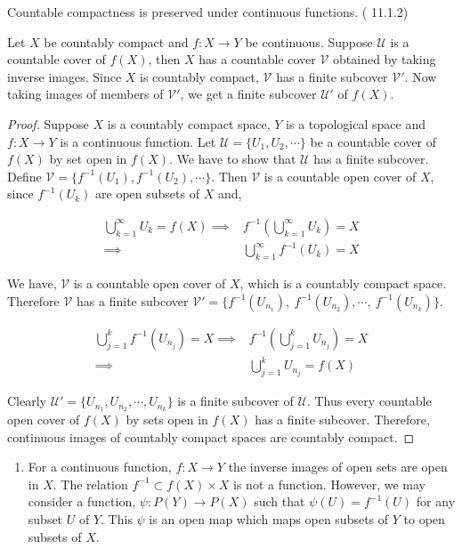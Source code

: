 \begin{theorem}
	Countable compactness is preserved under continuous functions. (\cite{joshi} 11.1.2)
\end{theorem}
\begin{synopsis}
	Let $X$ be countably compact and $f:X\to Y$ be continuous. Suppose $\mathcal{U}$ is a countable cover of $f(X)$, then $X$ has a countable cover $\mathcal{V}$ obtained by taking inverse images. Since $X$ is countably compact, $\mathcal{V}$ has a finite subcover $\mathcal{V}'$. Now taking images of members of $\mathcal{V}'$, we get a finite subcover $\mathcal{U}'$ of $f(X)$.
\end{synopsis}
\begin{proof}
	Suppose $X$ is a countably compact space, $Y$ is a topological space and $f:X \to Y$ is a continuous function. Let $\mathcal{U} = \{ U_1, U_2,\cdots \}$ be a countable cover of $f(X)$ by set open in $f(X)$. We have to show that $\mathcal{U}$ has a finite subcover.\\

	Define $\mathcal{V} = \{ f^{-1}(U_1), f^{-1}(U_2), \cdots \}$. Then $\mathcal{V}$ is a countable open cover of $X$, since $f^{-1}(U_k)$ are open subsets of $X$ and,

\begin{align*}
	\bigcup_{k = 1}^\infty U_k = f(X) \implies & f^{-1}\left(\bigcup_{k=1}^\infty U_k\right) = X\\
	\implies & \bigcup_{k = 1}^\infty f^{-1}(U_k) = X
\end{align*}

	We have, $\mathcal{V}$ is a countable open cover of $X$, which is a countably compact space. Therefore $\mathcal{V}$ has a finite subcover $\mathcal{V}' = \{ f^{-1}(U_{n_1}),\ f^{-1}(U_{n_2}),\cdots,\ f^{-1}(U_{n_k}) \}$.

\begin{align*}
	\bigcup_{j=1}^k f^{-1}(U_{n_j}) = X \implies & f^{-1}\left(\bigcup_{j=1}^k U_{n_j}\right) = X\\
	\implies & \bigcup_{j=1}^k U_{n_j} = f(X)
\end{align*}

	Clearly $\mathcal{U}' = \{ U_{n_1},U_{n_2},\cdots,U_{n_k}\}$ is a finite subcover of $\mathcal{U}$. Thus every countable open cover of $f(X)$ by sets open in $f(X)$ has a finite subcover. Therefore, continuous images of countably compact spaces are countably compact.
\end{proof}

\begin{remark}
	\begin{enumerate}
		\item For a continuous function, $f : X \to Y$ the inverse images of open sets are open in $X$. The relation $f^{-1} \subset f(X) \times X$ is not a function. However, we may consider a function, $\psi : P(Y) \to P(X)$ such that $\psi(U) = f^{-1}(U)$ for any subset $U$ of $Y$. This $\psi$ is an open map which maps open subsets of $Y$ to open subsets of $X$.
	\end{enumerate}
\end{remark}

